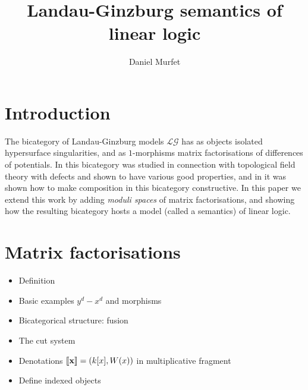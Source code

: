 \documentclass[english,letter paper,12pt,reqno]{article}
\theoremstyle{example}
\numberwithin{equation}{section}
\def\res{\operatorname{Res}}
\def\LG{\mathcal{LG}}
\begin{document}
\def\ScoreOverhang{1pt}

\def\Res{\res\!}
\newcommand{\ud}[1]{\operatorname{d}\!{#1}}
\newcommand{\Ress}[1]{\res_{#1}\!}
\newcommand{\cat}[1]{\mathcal{#1}}
\newcommand{\lto}{\longrightarrow}
\newcommand{\xlto}[1]{\stackrel{#1}\lto}
\newcommand{\mf}[1]{\mathfrak{#1}}
\newcommand{\md}[1]{\mathscr{#1}}
\newcommand{\church}[1]{\underline{#1}}
\newcommand{\prf}[1]{\underline{#1}}
\newcommand{\den}[1]{\llbracket #1 \rrbracket}
\def\l{\,|\,}
\def\sgn{\textup{sgn}}
\def\cont{\operatorname{cont}}

\title{Landau-Ginzburg semantics of linear logic}
\author{Daniel Murfet}

\maketitle

\section{Introduction}

The bicategory of Landau-Ginzburg models $\LG$ has as objects isolated hypersurface singularities, and as $1$-morphisms matrix factorisations of differences of potentials. In \cite{??} this bicategory was studied in connection with topological field theory with defects and shown to have various good properties, and in \cite{??} it was shown how to make composition in this bicategory constructive. In this paper we extend this work by adding \emph{moduli spaces} of matrix factorisations, and showing how the resulting bicategory hosts a model (called a semantics) of linear logic.

\section{Matrix factorisations}

\begin{itemize}
\item Definition
\item Basic examples $y^d - x^d$ and morphisms
\item Bicategorical structure: fusion
\item The cut system
\item Denotations $\den{\bold{x}} = (k[x], W(x))$ in multiplicative fragment
\item Define indexed objects
\end{itemize}
\end{document}
